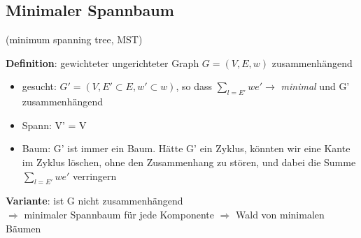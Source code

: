 \documentclass[11pt, fleqn]{scrreprt}
\begin{document}
	
	\subsection*{Minimaler Spannbaum} (minimum spanning tree, MST)\\
	
	\textbf{Definition}: gewichteter ungerichteter Graph $G = (V, E, w)$ zusammenhängend\\
	\begin{itemize}
		\item gesucht: $G' = (V, E' \subset E, w' \subset w)$, so dass $\sum\limits_{l = E'} we' \rightarrow$ \emph{minimal} und G' zusammenhängend
		\item \glqq Spann\grqq: V' = V
		\item \glqq Baum\grqq : G' ist immer ein Baum. Hätte G' ein Zyklus, könnten wir eine Kante im Zyklus löschen, ohne den Zusammenhang zu stören, und dabei die Summe $\sum\limits_{l=E'}we'$ verringern
	\end{itemize}
	
	\textbf{Variante}: ist G nicht zusammenhängend\\
	\hspace*{1cm} $\Rightarrow$ minimaler Spannbaum für jede Komponente $\Rightarrow$ Wald von minimalen Bäumen\\
	
\end{document}
